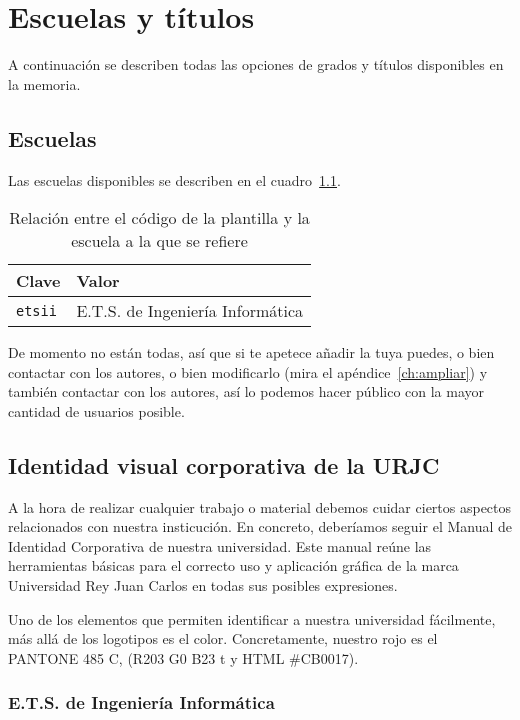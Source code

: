 \chapter{Escuelas y títulos}
\label{ch:escuelas-y-titulos}

A continuación se describen todas las opciones de grados y títulos disponibles en la memoria.

\section{Escuelas}

Las escuelas disponibles se describen en el cuadro~\ref{tbl:schools}.

\begin{table}
    \centering
    \begin{tabularx}{\textwidth}{@{}lX@{}}
        \toprule
        \textbf{Clave}  & \textbf{Valor} \\
        \midrule
        \texttt{etsii} & E.T.S. de Ingeniería Informática \\
        \bottomrule
    \end{tabularx}
    \caption{\label{tbl:schools} Relación entre el código de la plantilla y la escuela a la que se refiere}
\end{table}

De momento no están todas, así que si te apetece añadir la tuya puedes, o bien contactar con los autores, o bien modificarlo (mira el apéndice~\ref{ch:ampliar}) y también contactar con los autores, así lo podemos hacer público con la mayor cantidad de usuarios posible.

\section{Identidad visual corporativa de la URJC }

A la hora de realizar cualquier trabajo o material debemos cuidar ciertos aspectos relacionados con nuestra insticución. En concreto, deberíamos seguir el Manual de Identidad Corporativa de nuestra universidad. Este  manual reúne las herramientas básicas para el correcto uso y aplicación
gráfica de la marca Universidad Rey Juan Carlos en todas sus posibles expresiones.

Uno de los elementos que permiten identificar a nuestra universidad fácilmente, más allá de los logotipos es el color. Concretamente, nuestro rojo es el PANTONE 485 C, (R203 G0 B23 t y HTML \#CB0017).

\subsection{E.T.S. de Ingeniería Informática}

